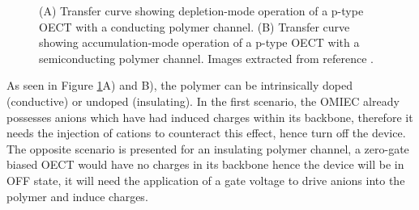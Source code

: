\begin{figure}[h]
	\centering
	\hspace{2em}
	\caption[Depletion- and accumulation-mode OECTs]{(A) Transfer curve showing depletion-mode operation of a p-type OECT with a conducting polymer channel. (B) Transfer curve showing accumulation-mode operation of a p-type OECT with a semiconducting polymer channel. Images extracted from reference \cite{rivnayOrganicElectrochemicalTransistors2018}.}
	\label{fig:modes}
\end{figure}

As seen in Figure \ref{fig:modes}A) and B), the polymer can be intrinsically doped (conductive) or undoped (insulating). In the first scenario, the OMIEC already possesses anions which have had induced charges within its backbone, therefore it needs the injection of cations to counteract this effect, hence turn off the device. The opposite scenario is presented for an insulating polymer channel, a zero-gate biased OECT would have no charges in its backbone hence the device will be in OFF state, it will need the application of a gate voltage to drive anions into the polymer and induce charges.


